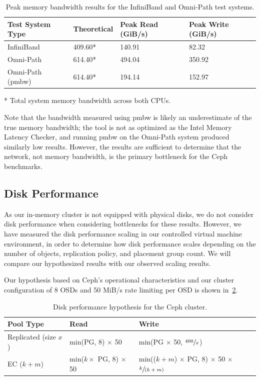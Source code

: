 \begin{table}[H]
\centering
\begin{tabular}{|llll|}
\hline
\textbf{Test System Type} & \textbf{Theoretical} & \textbf{Peak Read (GiB/s)} & \textbf{Peak Write (GiB/s)} \\
\hline
InfiniBand & 409.60* & 140.91 & 82.32 \\
Omni-Path & 614.40* & 494.04 & 350.92 \\
Omni-Path (pmbw) & 614.40* & 194.14 & 152.97 \\
\hline
\end{tabular}

\smallskip
\small{
    * Total system memory bandwidth across both \acs{CPU}s.
}

\caption[Peak Memory Bandwidth Results]{Peak memory bandwidth results for the InfiniBand and Omni-Path test systems.}
\label{tbl:peak-memory-bandwidth}
\end{table}

Note that the bandwidth measured using pmbw is likely an underestimate of the true memory bandwidth; the tool is not as optimized as the Intel Memory Latency Checker, and running pmbw on the Omni-Path system produced similarly low results. However, the results are sufficient to determine that the network, not memory bandwidth, is the primary  bottleneck for the Ceph benchmarks.




\subsection{Disk Performance}

As our in-memory cluster is not equipped with physical disks, we do not consider disk performance when considering bottlenecks for these results. However, we have measured the disk performance scaling in our controlled virtual machine environment, in order to determine how disk performance scales depending on the number of objects, replication policy, and placement group count. We will compare our hypothesized results with our observed scaling results.

Our hypothesis based on Ceph's operational characteristics and our cluster configuration of 8 \acp{OSD} and 50 MiB/s rate limiting per \ac{OSD} is shown in~\cref{tbl:disk-performance-hypothesis}.

\begin{table}[htbp]
\centering
\begin{tabular}{|l|l|l|}
\hline
\textbf{Pool Type} & \textbf{Read} & \textbf{Write} \\
\hline
Replicated (size $x$) & min(\acs{PG}, 8) $\times$ 50 & min(\acs{PG} $\times$ 50, $\sfrac{400}{x}$) \\
\hline
\acs{EC} ($k + m$) & min($k \times$ \acs{PG}, 8) $\times$ 50 & min(($k + m$) $\times$ \acs{PG}, 8) $\times$ 50 $\times$ $\sfrac{k}{(k+m)}$ \\
\hline
\end{tabular}
\caption[Disk Performance Hypothesis]{Disk performance hypothesis for the Ceph cluster.}
\label{tbl:disk-performance-hypothesis}
\end{table}

